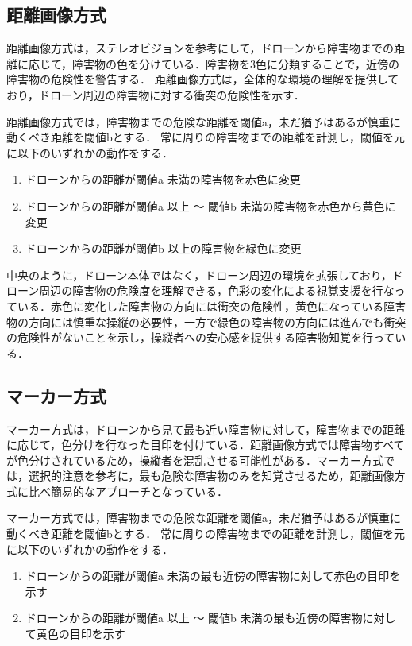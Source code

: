 \documentclass[submit, sigrecommended]{ipsj}
\begin{document}
\subsection{距離画像方式}
距離画像方式は，ステレオビジョンを参考にして，ドローンから障害物までの距離に応じて，障害物の色を分けている．障害物を3色に分類することで，近傍の障害物の危険性を警告する．
距離画像方式は，全体的な環境の理解を提供しており，ドローン周辺の障害物に対する衝突の危険性を示す．
\par
距離画像方式では，障害物までの危険な距離を閾値a，未だ猶予はあるが慎重に動くべき距離を閾値bとする．
常に周りの障害物までの距離を計測し，閾値を元に以下のいずれかの動作をする．

\begin{enumerate}
	\item ドローンからの距離が閾値a 未満の障害物を赤色に変更
    
  \item ドローンからの距離が閾値a 以上 〜 閾値b 未満の障害物を赤色から黄色に変更
    
  \item ドローンからの距離が閾値b 以上の障害物を緑色に変更
\end{enumerate}

中央のように，ドローン本体ではなく，ドローン周辺の環境を拡張しており，ドローン周辺の障害物の危険度を理解できる，色彩の変化による視覚支援を行なっている．赤色に変化した障害物の方向には衝突の危険性，黄色になっている障害物の方向には慎重な操縦の必要性，一方で緑色の障害物の方向には進んでも衝突の危険性がないことを示し，操縦者への安心感を提供する障害物知覚を行っている．



\subsection{マーカー方式}
マーカー方式は，ドローンから見て最も近い障害物に対して，障害物までの距離に応じて，色分けを行なった目印を付けている．距離画像方式では障害物すべてが色分けされているため，操縦者を混乱させる可能性がある．マーカー方式では，選択的注意を参考に，最も危険な障害物のみを知覚させるため，距離画像方式に比べ簡易的なアプローチとなっている．
\par
マーカー方式では，障害物までの危険な距離を閾値a，未だ猶予はあるが慎重に動くべき距離を閾値bとする．
常に周りの障害物までの距離を計測し，閾値を元に以下のいずれかの動作をする．

\begin{enumerate}
	\item ドローンからの距離が閾値a 未満の最も近傍の障害物に対して赤色の目印を示す
    
    \item ドローンからの距離が閾値a 以上 〜 閾値b 未満の最も近傍の障害物に対して黄色の目印を示す
\end{enumerate}
\end{document}
